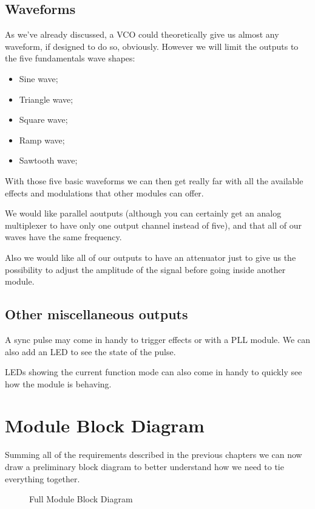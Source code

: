 \subsection*{Waveforms}

As we've already discussed, a VCO could theoretically give us almost any waveform,
if designed to do so, obviously. However we will limit the outputs to the five fundamentals
wave shapes:

\begin{itemize}
    \item Sine wave;
    \item Triangle wave;
    \item Square wave;
    \item Ramp wave;
    \item Sawtooth wave;
\end{itemize}

With those five basic waveforms we can then get really far with all the available effects
and modulations that other modules can offer.

We would like parallel aoutputs (although you can certainly get an analog multiplexer
to have only one output channel instead of five), and that all of our waves have the same
frequency.

Also we would like all of our outputs to have an attenuator just to give us the possibility
to adjust the amplitude of the signal before going inside another module.

\subsection*{Other miscellaneous outputs}

A sync pulse may come in handy to trigger effects or with a PLL module. We can also add
an LED to see the state of the pulse.

LEDs showing the current function mode can also come in handy to quickly see how the
module is behaving.


\section{Module Block Diagram}

Summing all of the requirements described in the previous chapters we can now draw a
preliminary block diagram to better understand how we need to tie everything together.

\begin{figure}[ht]
    \centering
    \def\svgwidth{\columnwidth}
    

    \caption{Full Module Block Diagram}
    \label{full-diagram}
\end{figure}
